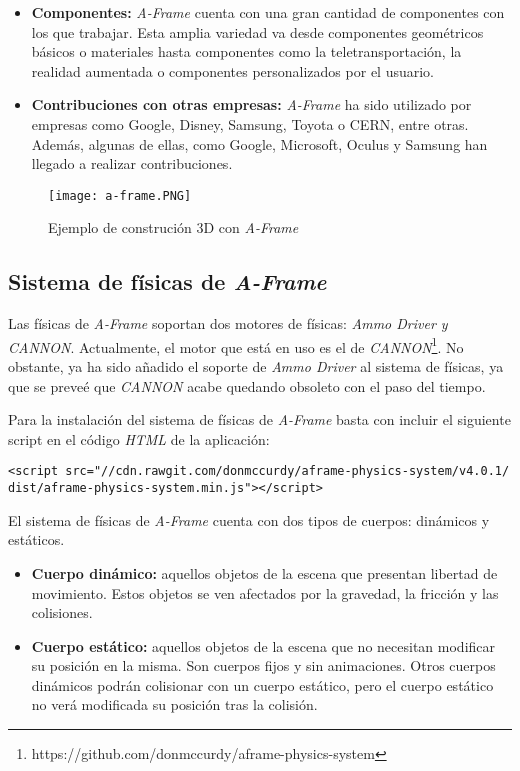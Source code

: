\begin{itemize}
    \item \textbf{Componentes:} \textit{A-Frame} cuenta con una gran cantidad de componentes con los que trabajar. Esta amplia variedad va desde componentes geométricos básicos o materiales hasta componentes como la teletransportación, la realidad aumentada o componentes personalizados por el usuario.
    \item \textbf{Contribuciones con otras empresas:} \textit{A-Frame} ha sido utilizado por empresas como Google, Disney, Samsung, Toyota o CERN, entre otras. Además, algunas de ellas, como Google, Microsoft, Oculus y Samsung han llegado a realizar contribuciones.
\end{itemize}

\begin{figure}[h!]
    \centering
    \texttt{[image: a-frame.PNG]} 
    \caption{Ejemplo de construción 3D con \textit{A-Frame} \footnotemark}
    \label{fig:a-frame}
\end{figure}

\subsection{Sistema de físicas de \textit{A-Frame}}
Las físicas de \textit{A-Frame} soportan dos motores de físicas: \textit{Ammo Driver y CANNON}. Actualmente, el motor que está en uso es el de \textit{CANNON}\footnote{https://github.com/donmccurdy/aframe-physics-system}. No obstante, ya ha sido añadido el soporte de \textit{Ammo Driver} al sistema de físicas, ya que se preveé que \textit{CANNON} acabe quedando obsoleto con el paso del tiempo. \newline

Para la instalación del sistema de físicas de \textit{A-Frame} basta con incluir el siguiente script en el código \textit{HTML} de la aplicación: 

\begin{verbatim}
<script src="//cdn.rawgit.com/donmccurdy/aframe-physics-system/v4.0.1/  
dist/aframe-physics-system.min.js"></script>
\end{verbatim}

El sistema de físicas de \textit{A-Frame} cuenta con dos tipos de cuerpos: dinámicos y estáticos.

\begin{itemize}
    \item \textbf{Cuerpo dinámico:} aquellos objetos de la escena que presentan libertad de movimiento. Estos objetos se ven afectados por la gravedad, la fricción y las colisiones.
    \item \textbf{Cuerpo estático:} aquellos objetos de la escena que no necesitan modificar su posición en la misma. Son cuerpos fijos y sin animaciones. Otros cuerpos dinámicos podrán colisionar con un cuerpo estático, pero el cuerpo estático no verá modificada su posición tras la colisión.
\end{itemize}

